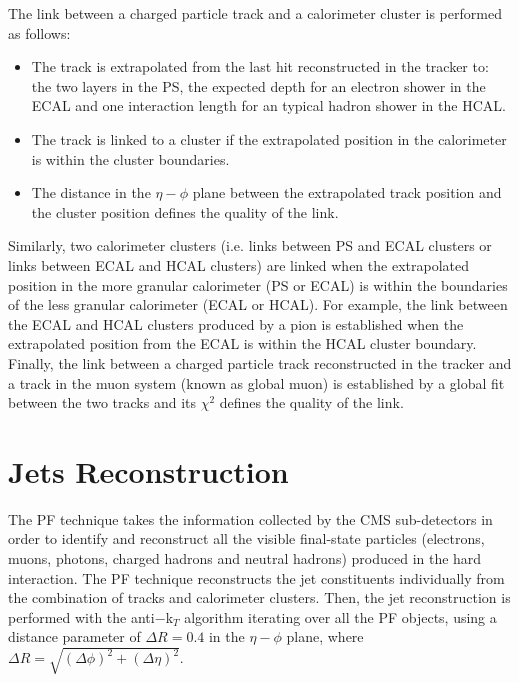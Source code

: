The link between a charged particle track and a calorimeter cluster is performed as follows:

\begin{itemize}
 \item The track is extrapolated from the last hit reconstructed in the tracker to: the two layers in the PS, the expected depth
 for an electron shower in the ECAL and one interaction length for an typical hadron shower in the HCAL. 
 \item The track is linked to a cluster if the extrapolated position in the calorimeter is within the cluster boundaries. 
 \item The distance in the $\eta-\phi$ plane between the extrapolated track position and the cluster position defines the quality of the link. 
\end{itemize}

Similarly, two calorimeter clusters (i.e. links between PS and ECAL clusters or links between ECAL and HCAL clusters) are linked when the 
extrapolated position in the more granular calorimeter (PS or ECAL) is within 
the boundaries of the less granular calorimeter (ECAL or HCAL). For example, the link between the ECAL and HCAL clusters
produced by a pion is established when the extrapolated position from the ECAL is within the HCAL cluster boundary. Finally, the 
link between a charged particle track reconstructed in the tracker and a track in the muon system (known as global muon) 
is established by a global fit between the two tracks and its $\chi^{2}$ defines the quality of the link.  

\section{Jets Reconstruction}
\label{sec:Jet}


The PF technique \cite{CMS-PAS-PFT-09-001} takes the information collected by the CMS sub-detectors in order to identify and reconstruct
all the visible final-state particles (electrons, muons, photons, charged hadrons and neutral hadrons) produced
in the hard interaction. The PF technique reconstructs the jet constituents individually from the
combination of tracks and calorimeter clusters. Then, the jet reconstruction is performed
with the anti$-$k$_{T}$ algorithm \cite{AntiKTAlgorithm} iterating over all the PF objects, using a distance parameter of
$\Delta R = 0.4$ in the $\eta-\phi$ plane, where $\Delta R = \sqrt{(\Delta \phi)^2+(\Delta \eta)^2}$.\\


